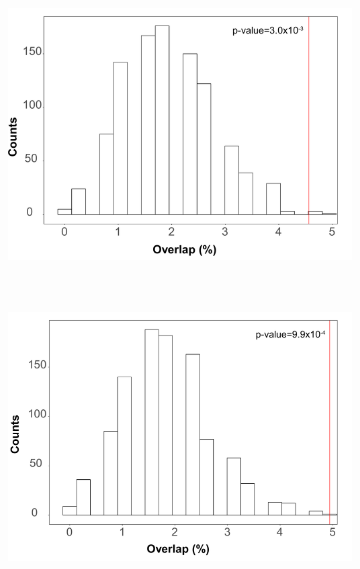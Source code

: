 \begin{figure}[htbp]
\begin{subfigure}[b]{0.40\textwidth}
\includegraphics[width=\textwidth]{./Results3/pdfs/PsA_FM_enrichment_for_CD4_consensus_ATAC_peaks_inside}
\caption{}
\end{subfigure}
~
\begin{subfigure}[b]{0.40\textwidth} 
\centering
\includegraphics[width=\textwidth]{./Results3/pdfs/PsA_FM_enrichment_for_CD8_consensus_ATAC_peaks_inside}
\caption{}
\end{subfigure}%
~
\begin{subfigure}[b]{0.40\textwidth} 
\centering

\end{subfigure}
\end{figure}
